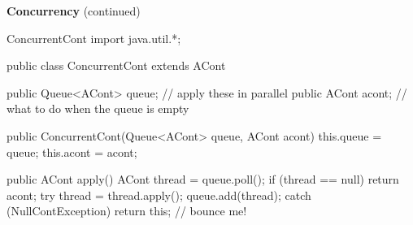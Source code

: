 \begin{minipage}[t]{\sw}
\slidenumber
\LARGE
{\bf Concurrency} (continued)
\large
\begin{qv}
ConcurrentCont
import java.util.*;

public class ConcurrentCont extends ACont {

    public Queue<ACont> queue; // apply these in parallel
    public ACont acont; // what to do when the queue is empty

    public ConcurrentCont(Queue<ACont> queue, ACont acont) {
        this.queue = queue;
        this.acont = acont;
    }

    public ACont apply() {
        ACont thread = queue.poll();
        if (thread == null)
            return acont;
        try {
            thread = thread.apply();
            queue.add(thread);
        } catch (NullContException) {
        }
        return this; // bounce me!
    }
}
\end{qv}
\end{minipage}
